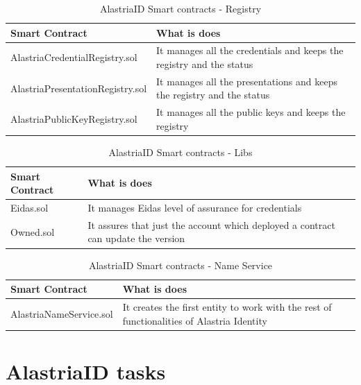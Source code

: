 \documentclass[target=mst,aauheader=]{thud}
\begin{document}
\begin{table}[h!]
    \begin{tabular}{|p{6cm}|p{12cm}|}
    \hline
    Smart Contract & What is does\\ [0.5ex] 
    \hline\hline
    AlastriaCredentialRegistry.sol & It manages all the credentials and keeps the registry and the status\\ 
    \hline
    AlastriaPresentationRegistry.sol & It manages all the presentations and keeps the registry and the status\\
    \hline
    AlastriaPublicKeyRegistry.sol & It manages all the public keys and keeps the registry \\
    \hline
    \end{tabular}
    \caption{AlastriaID Smart contracts - Registry}

\end{table}

\begin{table}[h!]
    \begin{tabular}{|p{6cm}|p{12cm}|}
    \hline
    Smart Contract & What is does\\ [0.5ex] 
    \hline\hline
    Eidas.sol & It manages Eidas level of assurance for credentials \\ 
    \hline
    Owned.sol & It assures that just the account which deployed a contract can update the version \\ 
    \hline
    \end{tabular}
    \caption{AlastriaID Smart contracts - Libs}

\end{table}

\begin{table}[h!]
    \begin{tabular}{|p{6cm}|p{12cm}|}
    \hline
    Smart Contract & What is does\\ [0.5ex] 
    \hline\hline
    AlastriaNameService.sol	 & It creates the first entity to work with the rest of functionalities of Alastria Identity \\ 
    \hline
    \end{tabular}
    \caption{AlastriaID Smart contracts - Name Service}

\end{table}

\section{AlastriaID tasks}
\end{document}
